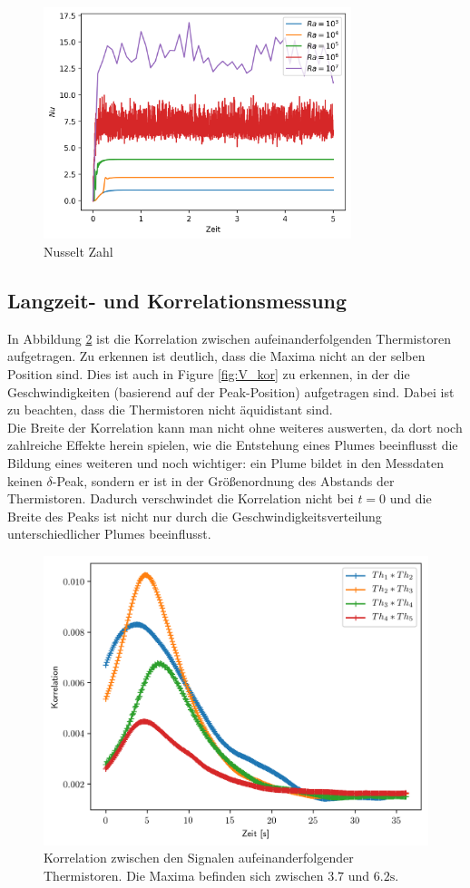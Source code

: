 \documentclass[12pt,a4paper,titlepage,headinclude]{scrartcl}
\numberwithin{equation}{subsection}
\begin{document}
\begin{figure}[!ht]
\centering
\includegraphics[width=0.8\textwidth]{Nu.png}
\caption{Nusselt Zahl}
\label{fig:nu_num}
\end{figure}





\subsection{Langzeit- und Korrelationsmessung}
In Abbildung \ref{fig:korrelation} ist die Korrelation zwischen aufeinanderfolgenden Thermistoren aufgetragen.
Zu erkennen ist deutlich, dass die Maxima nicht an der selben Position sind.
Dies ist auch in Figure \ref{fig:V_kor} zu erkennen, in der die Geschwindigkeiten (basierend auf der Peak-Position) aufgetragen sind.
Dabei ist zu beachten, dass die Thermistoren nicht äquidistant sind.\\

Die Breite der Korrelation kann man nicht ohne weiteres auswerten, da dort noch zahlreiche Effekte herein spielen, wie die Entstehung eines Plumes beeinflusst die Bildung eines weiteren und noch wichtiger: ein Plume bildet in den Messdaten keinen $\delta$-Peak, sondern er ist in der Größenordnung des Abstands der Thermistoren.
Dadurch verschwindet die Korrelation nicht bei $t=0$ und die Breite des Peaks ist nicht nur durch die Geschwindigkeitsverteilung unterschiedlicher Plumes beeinflusst.

\begin{figure}[!ht]
	\centering
	\includegraphics[width=0.7\linewidth]{kor}
	\caption{Korrelation zwischen den Signalen aufeinanderfolgender Thermistoren. Die Maxima befinden sich zwischen $3.7$ und $6.2\si\s$.}
\label{fig:korrelation}
\end{figure}
\end{document}

